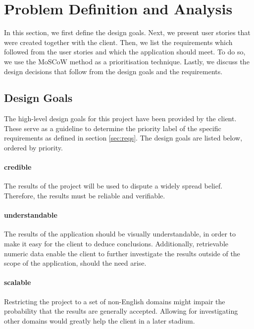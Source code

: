 \section{Problem Definition and Analysis}\label{sec:reqs-analysis}
In this section, we first define the design goals. Next, we present user stories that were created together with the client. Then, we list the requirements which followed from the user stories and which the application should meet. To do so, we use the MoSCoW method\cite{clegg1994case} as a prioritisation technique. Lastly, we discuss the design decisions that follow from the design goals and the requirements.




\subsection{Design Goals} \label{sec:design-goals}
The high-level design goals for this project have been provided by the client. These serve as a guideline to determine the priority label of the specific requirements as defined in section \ref{sec:reqs}. The design goals are listed below, ordered by priority.

\paragraph{credible} The results of the project will be used to dispute a widely spread belief. Therefore, the results must be reliable and verifiable.
\paragraph{understandable} The results of the application should be visually understandable, in order to make it easy for the client to deduce conclusions. Additionally, retrievable numeric data enable the client to further investigate the results outside of the scope of the application, should the need arise.
\paragraph{scalable} Restricting the project to a set of non-English domains might impair the probability that the results are generally accepted. Allowing for investigating other domains would greatly help the client in a later stadium.
